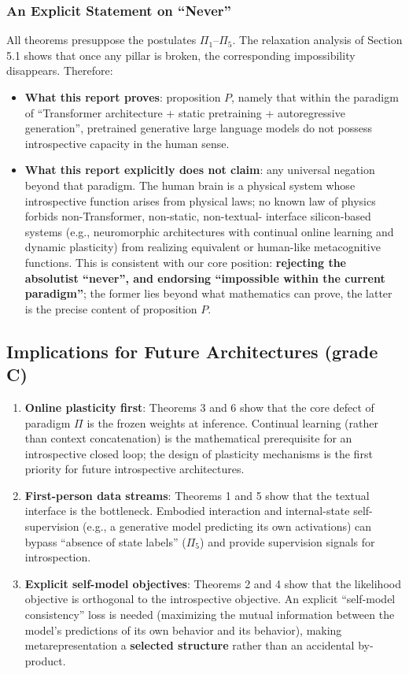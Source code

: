 \subsubsection{An Explicit Statement on ``Never''}

All theorems presuppose the postulates $\Pi_1$--$\Pi_5$. The relaxation
analysis of Section 5.1 shows that once any pillar is broken, the corresponding impossibility
disappears. Therefore:

\begin{itemize}
\item \textbf{What this report proves}: proposition $P$, namely that within the paradigm of
``Transformer architecture + static pretraining + autoregressive generation'', pretrained
generative large language models do not possess introspective capacity in the human sense.
\item \textbf{What this report explicitly does not claim}: any universal negation beyond that
paradigm. The human brain is a physical system whose introspective function arises from
physical laws; no known law of physics forbids non-Transformer, non-static, non-textual-
interface silicon-based systems (e.g., neuromorphic architectures with continual online
learning and dynamic plasticity) from realizing equivalent or human-like metacognitive
functions. This is consistent with our core position: \textbf{rejecting the
absolutist ``never'', and endorsing ``impossible within the current paradigm''}; the former
lies beyond what mathematics can prove, the latter is the precise content of proposition $P$.
\end{itemize}

\subsection{Implications for Future Architectures (grade C)}

\begin{enumerate}
\item \textbf{Online plasticity first}: Theorems 3 and 6 show that the core defect of
paradigm $\Pi$ is the frozen weights at inference. Continual learning (rather than context
concatenation) is the mathematical prerequisite for an introspective closed loop; the design
of plasticity mechanisms is the first priority for future introspective architectures.
\item \textbf{First-person data streams}: Theorems 1 and 5 show that the textual interface is
the bottleneck. Embodied interaction and internal-state self-supervision (e.g., a generative
model predicting its own activations) can bypass ``absence of state labels'' ($\Pi_5$) and
provide supervision signals for introspection.
\item \textbf{Explicit self-model objectives}: Theorems 2 and 4 show that the likelihood
objective is orthogonal to the introspective objective. An explicit ``self-model consistency''
loss is needed (maximizing the mutual information between the model's predictions of its own
behavior and its behavior), making metarepresentation a \textbf{selected structure} rather
than an accidental by-product.
\end{enumerate}
